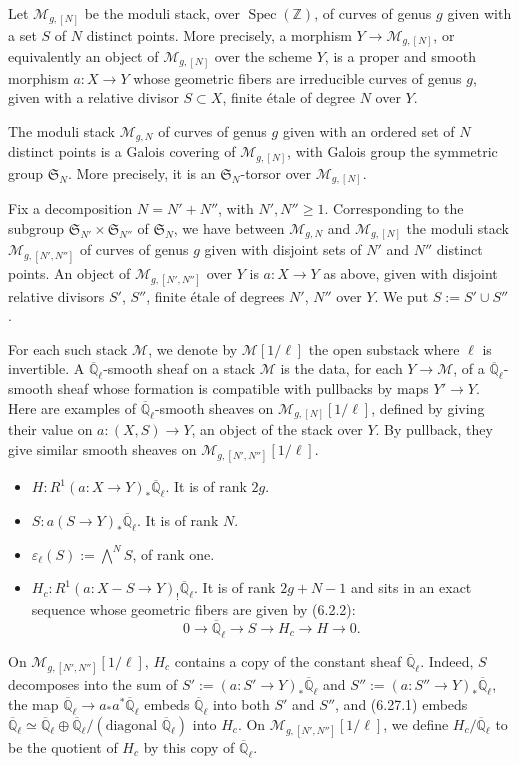\documentclass[10pt]{article}
\newcommand{\Ql}{\overline{\mathbb Q}_{\ell}}
\newcommand{\Z}{\mathbb Z}
\newcommand{\Spec}{\operatorname{Spec}}
\theoremstyle{deligne}
\newcommand{\heading}[1]{\vspace{0.7em}\noindent{\bfseries #1}\quad}
\begin{document}
\heading{6.27.} Let $\mathcal M_{g,[N]}$ be the moduli stack, over $\Spec(\Z)$, of curves of genus $g$ given with a set $S$ of $N$ distinct points. More precisely, a morphism $Y\to\mathcal M_{g,[N]}$, or equivalently an object of $\mathcal M_{g,[N]}$ over the scheme $Y$, is a proper and smooth morphism $a:X\to Y$ whose geometric fibers are irreducible curves of genus $g$, given with a relative divisor $S\subset X$, finite \'{e}tale of degree $N$ over $Y$.

The moduli stack $\mathcal M_{g,N}$ of curves of genus $g$ given with an ordered set of $N$ distinct points is a Galois covering of $\mathcal M_{g,[N]}$, with Galois group the symmetric group $\mathfrak S_N$. More precisely, it is an $\mathfrak S_N$-torsor over $\mathcal M_{g,[N]}$.

Fix a decomposition $N=N'+N''$, with $N',N''\ge1$. Corresponding to the subgroup $\mathfrak S_{N'}\times\mathfrak S_{N''}$ of $\mathfrak S_N$, we have between $\mathcal M_{g,N}$ and $\mathcal M_{g,[N]}$ the moduli stack $\mathcal M_{g,[N',N'']}$ of curves of genus $g$ given with disjoint sets of $N'$ and $N''$ distinct points. An object of $\mathcal M_{g,[N',N'']}$ over $Y$ is $a:X\to Y$ as above, given with disjoint relative divisors $S'$, $S''$, finite \'{e}tale of degrees $N'$, $N''$ over $Y$. We put $S:=S'\cup S''$.

For each such stack $\mathcal M$, we denote by $\mathcal M[1/\ell]$ the open substack where $\ell$ is invertible. A $\Ql$-smooth sheaf on a stack $\mathcal M$ is the data, for each $Y\to\mathcal M$, of a $\Ql$-smooth sheaf whose formation is compatible with pullbacks by maps $Y'\to Y$. Here are examples of $\Ql$-smooth sheaves on $\mathcal M_{g,[N]}[1/\ell]$, defined by giving their value on $a:(X,S)\to Y$, an object of the stack over $Y$. By pullback, they give similar smooth sheaves on $\mathcal M_{g,[N',N'']}[1/\ell]$.
\begin{itemize}
\item $H:R^1(a:X\to Y)_*\Ql$. It is of rank $2g$.
\item $S:a(S\to Y)_*\Ql$. It is of rank $N$.
\item $\varepsilon_\ell(S):=\bigwedge^N S$, of rank one.
\item $H_c:R^1(a:X-S\to Y)_!\Ql$. It is of rank $2g+N-1$ and sits in an exact sequence whose geometric fibers are given by (6.2.2):
\begin{equation}\tag{6.27.1}
0\longrightarrow\Ql\longrightarrow S\longrightarrow H_c\longrightarrow H\longrightarrow0.
\end{equation}
\end{itemize}
On $\mathcal M_{g,[N',N'']}[1/\ell]$, $H_c$ contains a copy of the constant sheaf $\Ql$. Indeed, $S$ decomposes into the sum of $S':=(a:S'\to Y)_*\Ql$ and $S'':=(a:S''\to Y)_*\Ql$, the map $\Ql\to a_*a^*\Ql$ embeds $\Ql$ into both $S'$ and $S''$, and (6.27.1) embeds $\Ql\simeq\Ql\oplus\Ql/(\text{diagonal }\Ql)$ into $H_c$. On $\mathcal M_{g,[N',N'']}[1/\ell]$, we define $H_c/\Ql$ to be the quotient of $H_c$ by this copy of $\Ql$.
\end{document}

